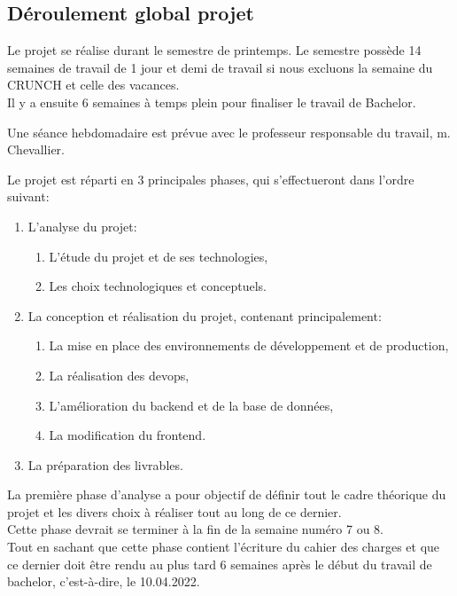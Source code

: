 \documentclass[
    iai, %
    il, %
]{heig-tb}
\begin{document}
\newpage
\subsection{Déroulement global projet}

Le projet se réalise durant le semestre de printemps. Le semestre possède 14 semaines de travail de 1 jour et demi de travail si nous excluons la semaine du CRUNCH et celle des vacances.\\
Il y a ensuite 6 semaines à temps plein pour finaliser le travail de Bachelor.

Une séance hebdomadaire est prévue avec le professeur responsable du travail, m. Chevallier.

Le projet est réparti en 3 principales phases, qui s'effectueront dans l'ordre suivant:
\begin{enumerate}
    \def\labelenumi{\arabic{enumi}.}
    \item L'analyse du projet:
          \begin{enumerate}
              \def\labelenumii{\alph{enumii}.}
              \item L'étude du projet et de ses technologies,
              \item Les choix technologiques et conceptuels.
          \end{enumerate}
    \item La conception et réalisation du projet, contenant principalement:
          \begin{enumerate}
              \def\labelenumii{\alph{enumii}.}
              \item La mise en place des environnements de développement et de production,
              \item La réalisation des \Gls{devops},
              \item L'amélioration du \Gls{backend} et de la base de données,
              \item La modification du \Gls{frontend}.
          \end{enumerate}
    \item La préparation des livrables.
\end{enumerate}

La première phase d'analyse a pour objectif de définir tout le cadre théorique du projet et les divers choix à réaliser tout au long de ce dernier.\\
Cette phase devrait se terminer à la fin de la semaine numéro 7 ou 8.\\
Tout en sachant que cette phase contient l'écriture du cahier des charges et que ce dernier doit être rendu au plus tard 6 semaines après le début du travail de bachelor, c'est-à-dire, le 10.04.2022.
\end{document}
